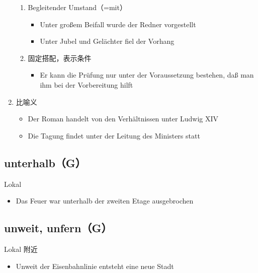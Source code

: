 \documentclass[UTF8]{report}
\begin{document}
\begin{enumerate}
\begin{enumerate}
        \item Begleitender Umstand（=mit）
        \begin{itemize}
            \item Unter großem Beifall wurde der Redner vorgestellt
            \item Unter Jubel und Gelächter fiel der Vorhang
        \end{itemize}
        \item 固定搭配，表示条件
        \begin{itemize}
            \item Er kann die Prüfung nur unter der Voraussetzung bestehen, daß man ihm bei der Vorbereitung hilft
        \end{itemize}
    \end{enumerate}
    \item 比喻义
    \begin{itemize}
        \item Der Roman handelt von den Verhältnissen unter Ludwig XIV
        \item Die Tagung findet unter der Leitung des Ministers statt
    \end{itemize}
\end{enumerate}

\subsection{unterhalb（G）}
Lokal
\begin{itemize}
    \item Das Feuer war unterhalb der zweiten Etage ausgebrochen
\end{itemize}

\subsection{unweit, unfern（G）}
Lokal 附近
\begin{itemize}
    \item Unweit der Eisenbahnlinie entsteht eine neue Stadt
\end{itemize}
\end{document}
